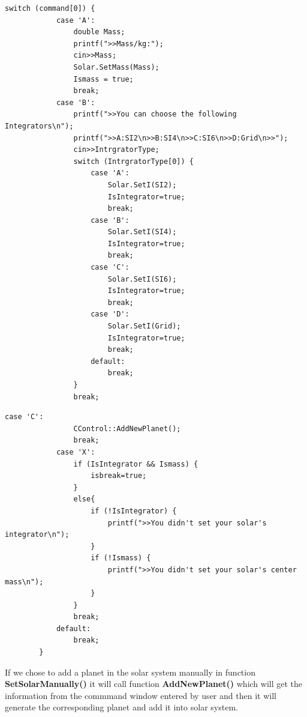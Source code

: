 \documentclass[12pt]{article}
\begin{document}
\begin{lstlisting}[caption=switch part I]
        switch (command[0]) {
            case 'A':
                double Mass;
                printf(">>Mass/kg:");
                cin>>Mass;
                Solar.SetMass(Mass);
                Ismass = true;
                break;
            case 'B':
                printf(">>You can choose the following Integrators\n");
                printf(">>A:SI2\n>>B:SI4\n>>C:SI6\n>>D:Grid\n>>");
                cin>>IntrgratorType;
                switch (IntrgratorType[0]) {
                    case 'A':
                        Solar.SetI(SI2);
                        IsIntegrator=true;
                        break;
                    case 'B':
                        Solar.SetI(SI4);
                        IsIntegrator=true;
                        break;
                    case 'C':
                        Solar.SetI(SI6);
                        IsIntegrator=true;
                        break;
                    case 'D':
                        Solar.SetI(Grid);
                        IsIntegrator=true;
                        break;
                    default:
                        break;
                }
                break;
\end{lstlisting}
\clearpage
\begin{lstlisting}[caption=switch part II]
            case 'C':
                CControl::AddNewPlanet();
                break;
            case 'X':
                if (IsIntegrator && Ismass) {
                    isbreak=true;
                }
                else{
                    if (!IsIntegrator) {
                        printf(">>You didn't set your solar's integrator\n");
                    }
                    if (!Ismass) {
                        printf(">>You didn't set your solar's center mass\n");
                    }
                }
                break;
            default:
                break;
        }
\end{lstlisting}
\clearpage

If we chose to add a planet in the solar system manually 
in function \textbf{SetSolarManually()} it will call function
\textbf{AddNewPlanet()} which will get the information from the commmand window
entered by user and then it will generate the corresponding planet and add it into solar system.\\
\end{document}
